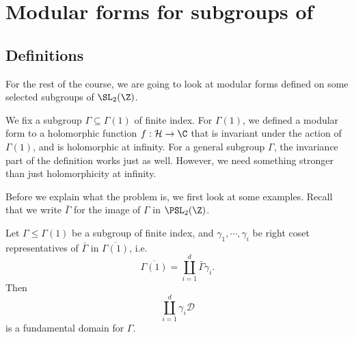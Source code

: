 \documentclass[a4paper]{article}
\renewcommand{\H}{\mathcal{H}}
\begin{document}
\section{Modular forms for subgroups of }
\subsection{Definitions}
For the rest of the course, we are going to look at modular forms defined on some selected subgroups of $\SL_2(\Z)$.

We fix a subgroup $\Gamma \subseteq \Gamma(1)$ of finite index. For $\Gamma(1)$, we defined a modular form to a holomorphic function $f: \H \to \C$ that is invariant under the action of $\Gamma(1)$, and is holomorphic at infinity. For a general subgroup $\Gamma$, the invariance part of the definition works just as well. However, we need something stronger than just holomorphicity at infinity.

Before we explain what the problem is, we first look at some examples. Recall that we write $\bar{\Gamma}$ for the image of $\Gamma$ in $\PSL_2(\Z)$.

\begin{lemma}
  Let $\Gamma \leq \Gamma(1)$ be a subgroup of finite index, and $\gamma_1, \cdots, \gamma_i$ be right coset representatives of $\bar{\Gamma}$ in $\overline{\Gamma(1)}$, i.e.
  \[
    \overline{\Gamma(1)} = \coprod_{i = 1}^d \bar{\Gamma} \gamma_i.
  \]
  Then
  \[
    \coprod_{i = 1}^d \gamma_i \mathcal{D}
  \]
  is a fundamental domain for $\Gamma$.
\end{lemma}
\end{document}
